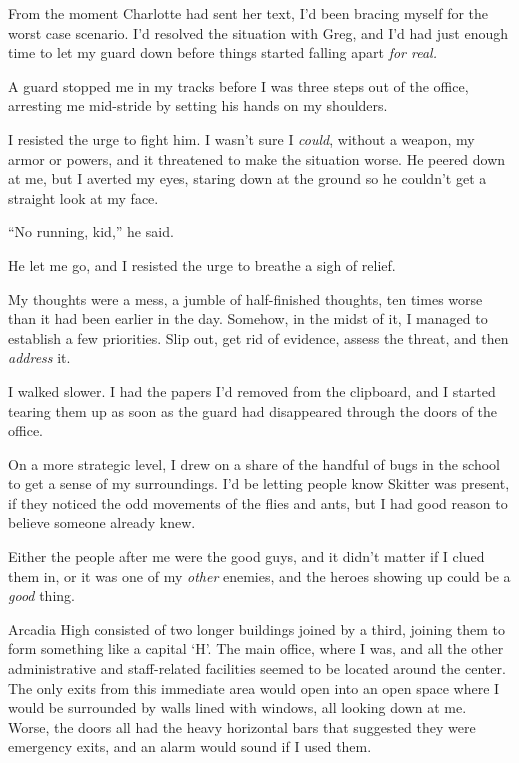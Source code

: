 





From the moment Charlotte had sent her text, I'd been bracing myself for the worst case scenario.  I'd resolved the situation with Greg, and I'd had just enough time to let my guard down before things started falling apart \emph{for real.}



A guard stopped me in my tracks before I was three steps out of the office, arresting me mid-stride by setting his hands on my shoulders.



I resisted the urge to fight him.  I wasn't sure I \emph{could}, without a weapon, my armor or powers, and it threatened to make the situation worse.  He peered down at me, but I averted my eyes, staring down at the ground so he couldn't get a straight look at my face.



``No running, kid,'' he said.



He let me go, and I resisted the urge to breathe a sigh of relief.



My thoughts were a mess, a jumble of half-finished thoughts, ten times worse than it had been earlier in the day.  Somehow, in the midst of it, I managed to establish a few priorities.  Slip out, get rid of evidence, assess the threat, and then \emph{address }it.



I walked slower.  I had the papers I'd removed from the clipboard, and I started tearing them up as soon as the guard had disappeared through the doors of the office.



On a more strategic level, I drew on a share of the handful of bugs in the school to get a sense of my surroundings.  I'd be letting people know Skitter was present, if they noticed the odd movements of the flies and ants, but I had good reason to believe someone already knew.



Either the people after me were the good guys, and it didn't matter if I clued them in, or it was one of my \emph{other} enemies, and the heroes showing up could be a \emph{good} thing.



Arcadia High consisted of two longer buildings joined by a third, joining them to form something like a capital `H'.  The main office, where I was, and all the other administrative and staff-related facilities seemed to be located around the center.  The only exits from this immediate area would open into an open space where I would be surrounded by walls lined with windows, all looking down at me.  Worse, the doors all had the heavy horizontal bars that suggested they were emergency exits, and an alarm would sound if I used them.



